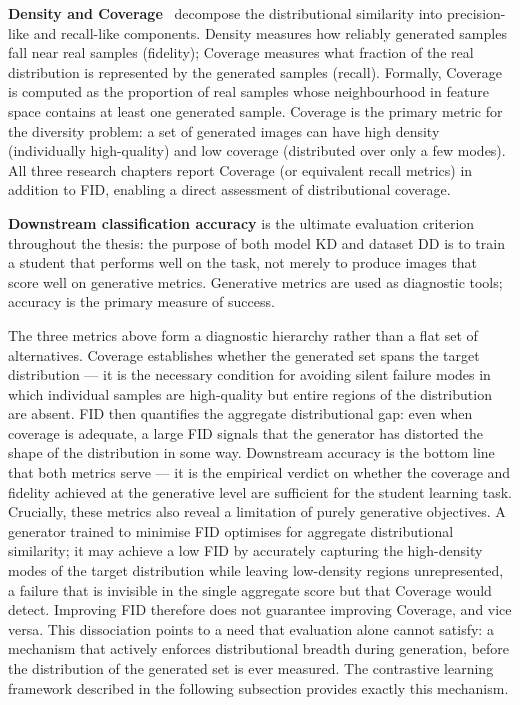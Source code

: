 \begin{foldable}
  \textbf{Density and Coverage}~\cite{naeem2020reliable} decompose the distributional similarity into precision-like and recall-like components.
  Density measures how reliably generated samples fall near real samples (fidelity); Coverage measures what fraction of the real distribution is represented by the generated samples (recall).
  Formally, Coverage is computed as the proportion of real samples whose neighbourhood in feature space contains at least one generated sample.
  Coverage is the primary metric for the diversity problem: a set of generated images can have high density (individually high-quality) and low coverage (distributed over only a few modes).
  All three research chapters report Coverage (or equivalent recall metrics) in addition to FID, enabling a direct assessment of distributional coverage.
\end{foldable}

\begin{foldable}
  \textbf{Downstream classification accuracy} is the ultimate evaluation criterion throughout the thesis: the purpose of both model KD and dataset DD is to train a student that performs well on the task, not merely to produce images that score well on generative metrics.
  Generative metrics are used as diagnostic tools; accuracy is the primary measure of success.
\end{foldable}

\begin{foldable}
  The three metrics above form a diagnostic hierarchy rather than a flat set of alternatives.
  Coverage establishes whether the generated set spans the target distribution --- it is the necessary condition for avoiding silent failure modes in which individual samples are high-quality but entire regions of the distribution are absent.
  \ac{FID} then quantifies the aggregate distributional gap: even when coverage is adequate, a large \ac{FID} signals that the generator has distorted the shape of the distribution in some way.
  Downstream accuracy is the bottom line that both metrics serve --- it is the empirical verdict on whether the coverage and fidelity achieved at the generative level are sufficient for the student learning task.
  Crucially, these metrics also reveal a limitation of purely generative objectives.
  A generator trained to minimise \ac{FID} optimises for aggregate distributional similarity; it may achieve a low \ac{FID} by accurately capturing the high-density modes of the target distribution while leaving low-density regions unrepresented, a failure that is invisible in the single aggregate score but that Coverage would detect.
  Improving \ac{FID} therefore does not guarantee improving Coverage, and vice versa.
  This dissociation points to a need that evaluation alone cannot satisfy: a mechanism that actively enforces distributional breadth during generation, before the distribution of the generated set is ever measured.
  The contrastive learning framework described in the following subsection provides exactly this mechanism.
\end{foldable}

